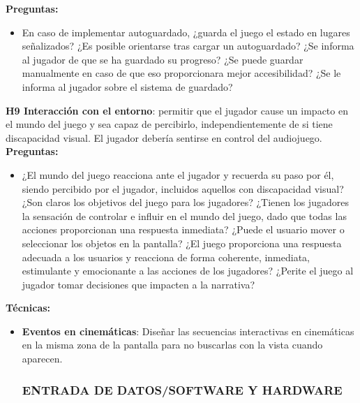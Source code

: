 \textbf{Preguntas:}
\begin{itemize}
	\item En caso de implementar autoguardado, ¿guarda el juego el estado en lugares señalizados? ¿Es posible orientarse tras cargar un autoguardado? ¿Se informa al jugador de que se ha guardado su progreso? ¿Se puede guardar manualmente en caso de que eso proporcionara mejor accesibilidad? ¿Se le informa al jugador sobre el sistema de guardado?
\end{itemize}
\textbf{H9 Interacción con el entorno}: permitir que el jugador cause un impacto en el mundo del juego y sea capaz de percibirlo, independientemente de si tiene discapacidad visual. El jugador debería sentirse en control del audiojuego. \cite{keilSoundsEngagingInvestigating2025} \cite{deborbacamposUsabilityAccessibilityGameplay2016} \cite{teixeiraborgesFairPlayGuidelines2018a}\\
\textbf{Preguntas:}
\begin{itemize}
\item ¿El mundo del juego reacciona ante el jugador y recuerda su paso por él, siendo percibido por el jugador, incluidos aquellos con discapacidad visual? ¿Son claros los objetivos del juego para los jugadores? ¿Tienen los jugadores la sensación de controlar e influir en el mundo del juego, dado que todas las acciones proporcionan una respuesta inmediata? ¿Puede el usuario mover o seleccionar los objetos en la pantalla? ¿El juego proporciona una respuesta adecuada a los usuarios y reacciona de forma coherente, inmediata, estimulante y emocionante a las acciones de los jugadores? ¿Perite el juego al jugador tomar decisiones que impacten a la narrativa?
\end{itemize}
\textbf{Técnicas:}
\begin{itemize}
\item \textbf{Eventos en cinemáticas}: Diseñar las secuencias interactivas en cinemáticas en la misma zona de la pantalla para no buscarlas con la vista cuando aparecen. \cite{LibroBlancoAccesibilidad} 
\subsubsection{ENTRADA DE DATOS/SOFTWARE Y HARDWARE}
\end{itemize}

